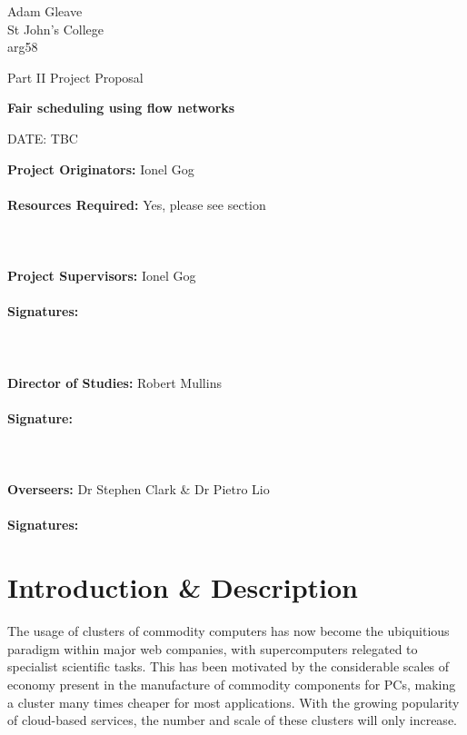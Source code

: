 \begin{flushright}
	\small {
		Adam Gleave \\
		St John's College \\
		arg58
	}
\end{flushright}

\vfill

\centerline{\Large Part II Project Proposal}
\vspace{0.4in}
\centerline{\LARGE \textbf{Fair scheduling using flow networks }}
\vspace{0.4in}
\centerline{\large DATE: TBC}

\vfill

\textbf{Project Originators:} Ionel Gog \hfil \\ \\
\textbf{Resources Required:} Yes, please see section~ \hfil \\ \\ \\ \\
\textbf{Project Supervisors:} Ionel Gog \hfil \\ \\
\textbf{Signatures:} \hfil \\ \\ \\ \\
\textbf{Director of Studies:} Robert Mullins \hfil \\ \\
\textbf{Signature:} \hfil \\ \\ \\ \\
\textbf{Overseers:} Dr Stephen Clark \& Dr Pietro Lio \hfil \\ \\
\textbf{Signatures:} \hfil \\

\vfil 

\section*{Introduction \& Description}

The usage of clusters of commodity computers has now become the ubiquitious paradigm within major web companies, with supercomputers relegated to specialist scientific tasks. This has been motivated by the considerable scales of economy present in the manufacture of commodity components for PCs, making a cluster many times cheaper for most applications. With the growing popularity of cloud-based services, the number and scale of these clusters will only increase.

